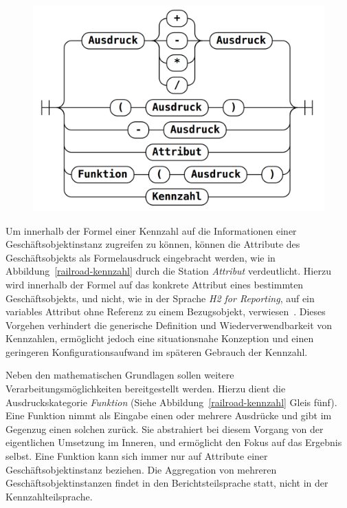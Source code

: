 \documentclass[
  language=german, %
  type=bachelor%
]{isthesis}
\begin{document}
\begin{content}

  \begin{figure}[caption={Ausdruck Syntaxdiagramm \protect\footnotemark}, label={railroad-kennzahl}]
    \includegraphics[scale=0.25]{content/figures/railroad-kennzahl.png}
  \end{figure}
	
  Um innerhalb der Formel einer Kennzahl auf die Informationen einer
  Geschäftsobjektinstanz zugreifen zu können, können die Attribute des
  Geschäftsobjekts als Formelausdruck eingebracht werden, wie in
  Abbildung~\ref{railroad-kennzahl} durch die Station \textit{Attribut}
  verdeutlicht. Hierzu wird innerhalb der Formel auf das konkrete Attribut
  eines bestimmten Geschäftsobjekts, und nicht, wie in der Sprache \textit{H2
  for Reporting}, auf ein variables Attribut ohne Referenz zu einem
  Bezugsobjekt, verwiesen~\cite[][S.  20]{becker2007h2}. Dieses Vorgehen
  verhindert die generische Definition und Wiederverwendbarkeit von Kennzahlen,
  ermöglicht jedoch eine situationsnahe Konzeption und einen geringeren
  Konfigurationsaufwand im späteren Gebrauch der Kennzahl.

  Neben den mathematischen Grundlagen sollen weitere Verarbeitungsmöglichkeiten
  bereitgestellt werden. Hierzu dient die Ausdruckskategorie \textit{Funktion}
  (Siehe Abbildung~\ref{railroad-kennzahl} Gleis fünf). Eine Funktion nimmt als
  Eingabe einen oder mehrere Ausdrücke und gibt im Gegenzug einen solchen
  zurück. Sie abstrahiert bei diesem Vorgang von der eigentlichen Umsetzung im
  Inneren, und ermöglicht den Fokus auf das Ergebnis selbst. Eine Funktion kann
  sich immer nur auf Attribute einer Geschäftsobjektinstanz beziehen. Die
  Aggregation von mehreren Geschäftsobjektinstanzen findet in den
  Berichtsteilsprache statt, nicht in der Kennzahlteilsprache.


\end{content}
\end{document}
